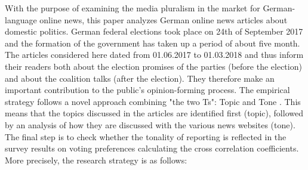 \documentclass[12pt,a4paper,notitlepage]{article}
\begin{document}
With the purpose of examining the media pluralism in the market for German-language online news, this paper analyzes German online news articles about domestic politics. German federal elections took place on 24th of September 2017 and the formation of the government has taken up a period of about five month. The articles considered here dated from 01.06.2017 to 01.03.2018 and thus inform their readers both about the election promises of the parties (before the election) and about the coalition talks (after the election). They therefore make an important contribution to the public's opinion-forming process. The empirical strategy follows a novel approach combining "the two Ts": Topic and Tone \citep{hansen_shocking_2016}. This means that the topics discussed in the articles are identified first (topic), followed by an analysis of how they are discussed with the various news websites (tone). The final step is to check whether the tonality of reporting is reflected in the survey results on voting preferences calculating the cross correlation coefficients. More precisely, the research strategy is as follows:
\end{document}
